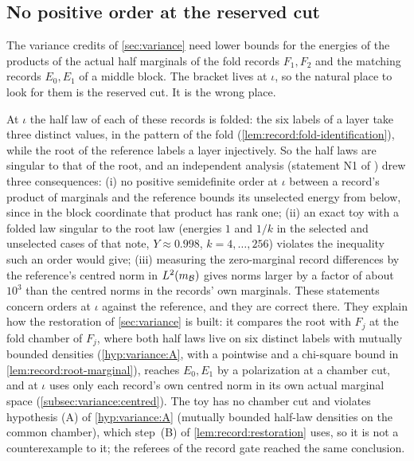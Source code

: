 \subsection{No positive order at the reserved cut}\label{subsec:obs:reserved}

The variance credits of \cref{sec:variance} need lower bounds for the energies
of the products of the actual half marginals of the fold records $F_1,F_2$ and
the matching records $E_0,E_1$ of a middle block. The bracket lives at
$\iota$, so the natural place to look for them is the reserved cut. It is the
wrong place.

\begin{remark}\label{rem:record:variance-n1}
At $\iota$ the half law of each of these records is folded: the six labels of a
layer take three distinct values, in the pattern of the fold
(\cref{lem:record:fold-identification}), while the root of the reference
labels a layer injectively. So the half laws are singular to that of the root,
and an independent analysis (statement N1 of
) drew
three consequences: (i) no positive semidefinite order at $\iota$ between a
record's product of marginals and the reference bounds its unselected energy
from below, since in the block coordinate that product has rank one; (ii) an
exact toy with a folded law singular to the root law (energies $1$ and $1/k$ in the selected and unselected cases of that note, $Y\approx0.998$, $k=4,\dots,256$) violates the
inequality such an order would give; (iii) measuring the zero-marginal record
differences by the reference's centred norm in $L^2(m_\mathcal B)$ gives norms larger by a factor of about $10^3$ than the centred norms in the records' own marginals. These statements concern orders at $\iota$ against the reference,
and they are correct there. They explain how the restoration of
\cref{sec:variance} is built: it compares the root with $F_j$ at the fold
chamber of $F_j$, where both half laws live on six distinct labels with
mutually bounded densities (\cref{hyp:variance:A}, with a pointwise and a
chi-square bound in \cref{lem:record:root-marginal}), reaches $E_0,E_1$ by a
polarization at a chamber cut, and at $\iota$ uses only each record's own
centred norm in its own actual marginal space (\cref{subsec:variance:centred}).
The toy has no chamber cut and violates hypothesis (A) of \cref{hyp:variance:A} (mutually bounded half-law densities on the common chamber), which step~(B) of \cref{lem:record:restoration} uses, so it is not a counterexample to it; the
referees of the record gate reached the same conclusion.
\end{remark}

